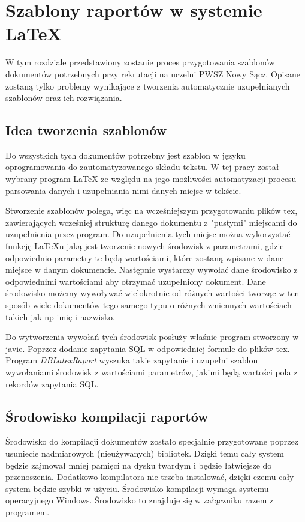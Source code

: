 \chapter{Szablony raportów w systemie LaTeX}
\label{ch:szablonyraportowwsystemielatex}

W tym rozdziale przedstawiony zostanie proces przygotowania szablonów dokumentów potrzebnych przy rekrutacji na uczelni PWSZ Nowy Sącz. Opisane zostaną tylko problemy wynikające z tworzenia automatycznie uzupełnianych szablonów oraz ich rozwiązania.

\section{Idea tworzenia szablonów}

Do wszystkich tych dokumentów potrzebny jest szablon w języku oprogramowania do zautomatyzowanego składu tekstu. W tej pracy został wybrany program LaTeX ze względu na jego możliwości automatyzacji procesu parsowania danych i uzupełniania nimi danych miejsc w tekście.
\par Stworzenie szablonów polega, więc na wcześniejszym przygotowaniu plików tex, zawierających wcześniej strukturę danego dokumentu z "pustymi" miejscami do uzupełnienia przez program. Do uzupełnienia tych miejsc można wykorzystać funkcję LaTeXu jaką jest tworzenie nowych środowisk z parametrami, gdzie odpowiednio parametry te będą wartościami, które zostaną wpisane w dane miejsce w danym dokumencie. Następnie wystarczy wywołać dane środowisko z odpowiednimi wartościami aby otrzymać uzupełniony dokument. Dane środowisko możemy wywoływać wielokrotnie od różnych wartości tworząc w ten sposób wiele dokumentów tego samego typu o różnych zmiennych wartościach takich jak np imię i nazwisko. 
\par Do wytworzenia wywołań tych środowisk posłuży właśnie program stworzony w javie. Poprzez dodanie zapytania SQL w odpowiedniej formule do plików tex. Program \emph{DBLatexRaport} wyszuka takie zapytanie i uzupełni szablon wywołaniami środowisk z wartościami parametrów, jakimi będą wartości pola z rekordów zapytania SQL. 

\section{Środowisko kompilacji raportów}

Środowisko do kompilacji dokumentów zostało specjalnie przygotowane poprzez usuniecie nadmiarowych (nieużywanych) bibliotek. Dzięki temu cały system będzie zajmował mniej pamięci na dysku twardym i będzie łatwiejsze do przenoszenia. Dodatkowo kompilatora nie trzeba instalować, dzięki czemu cały system będzie szybki w użyciu. Środowisko kompilacji wymaga systemu operacyjnego Windows. Środowisko to znajduje się w załączniku razem z programem.


